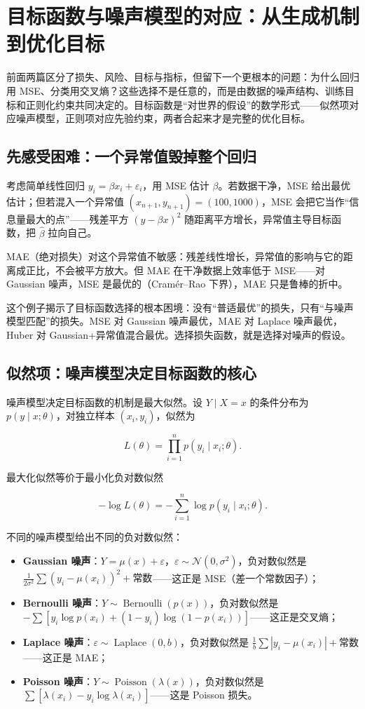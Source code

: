 \section{目标函数与噪声模型的对应：从生成机制到优化目标}

前面两篇区分了损失、风险、目标与指标，但留下一个更根本的问题：为什么回归用 MSE、分类用交叉熵？这些选择不是任意的，而是由数据的噪声结构、训练目标和正则化约束共同决定的。目标函数是``对世界的假设''的数学形式——似然项对应噪声模型，正则项对应先验约束，两者合起来才是完整的优化目标。

\subsection{先感受困难：一个异常值毁掉整个回归}

考虑简单线性回归 $y_i=\beta x_i+\varepsilon_i$，用 MSE 估计 $\beta$。若数据干净，MSE 给出最优估计；但若混入一个异常值 $(x_{n+1},y_{n+1})=(100,1000)$，MSE 会把它当作``信息量最大的点''——残差平方 $(y-\beta x)^2$ 随距离平方增长，异常值主导目标函数，把 $\widehat\beta$ 拉向自己。

MAE（绝对损失）对这个异常值不敏感：残差线性增长，异常值的影响与它的距离成正比，不会被平方放大。但 MAE 在干净数据上效率低于 MSE——对 Gaussian 噪声，MSE 是最优的（Cramér--Rao 下界），MAE 只是鲁棒的折中。

这个例子揭示了目标函数选择的根本困境：没有``普适最优''的损失，只有``与噪声模型匹配''的损失。MSE 对 Gaussian 噪声最优，MAE 对 Laplace 噪声最优，Huber 对 Gaussian+异常值混合最优。选择损失函数，就是选择对噪声的假设。

\subsection{似然项：噪声模型决定目标函数的核心}

噪声模型决定目标函数的机制是最大似然。设 $Y\mid X=x$ 的条件分布为 $p(y\mid x;\theta)$，对独立样本 $(x_i,y_i)$，似然为

\[
L(\theta)=\prod_{i=1}^n p(y_i\mid x_i;\theta).
\]

最大化似然等价于最小化负对数似然

\[
-\log L(\theta)=-\sum_{i=1}^n\log p(y_i\mid x_i;\theta).
\]

不同的噪声模型给出不同的负对数似然：

\begin{itemize}
\tightlist
\item
  \textbf{Gaussian 噪声}：$Y=\mu(x)+\varepsilon$，$\varepsilon\sim\mathcal N(0,\sigma^2)$，负对数似然是 $\frac{1}{2\sigma^2}\sum(y_i-\mu(x_i))^2+\text{常数}$——这正是 MSE（差一个常数因子）；
\item
  \textbf{Bernoulli 噪声}：$Y\sim\operatorname{Bernoulli}(p(x))$，负对数似然是 $-\sum[y_i\log p(x_i)+(1-y_i)\log(1-p(x_i))]$——这正是交叉熵；
\item
  \textbf{Laplace 噪声}：$\varepsilon\sim\operatorname{Laplace}(0,b)$，负对数似然是 $\frac1b\sum|y_i-\mu(x_i)|+\text{常数}$——这正是 MAE；
\item
  \textbf{Poisson 噪声}：$Y\sim\operatorname{Poisson}(\lambda(x))$，负对数似然是 $\sum[\lambda(x_i)-y_i\log\lambda(x_i)]$——这是 Poisson 损失。
\end{itemize}

